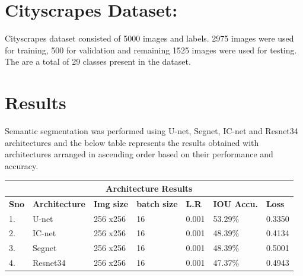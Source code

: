 \documentclass{IEEEtran}
\begin{document}
\section{\textbf{Cityscrapes Dataset:}}
Cityscrapes dataset consisted of 5000 images and labels. 2975 images were used for training, 500 for validation and remaining 1525 images were used for testing. The are a total of 29 classes present in the dataset.

\section{\textbf{Results}}
Semantic segmentation was performed using U-net, Segnet, IC-net and Resnet34 architectures and the below table represents the results obtained with architectures arranged in ascending order based on their performance and accuracy.

\begin{tabular}{ |p{0.6cm}|p{1.8cm}|p{0.6cm}|p{0.6cm}|p{0.6cm}|p{0.8cm}|p{0.8cm}|}
 \hline
 \multicolumn{7}{|c|}{\textbf{Architecture Results}} \\
 \hline
 \textbf{Sno} & \textbf{Architecture} & \textbf{Img size} & \textbf{batch size} & \textbf{L.R} & \textbf{IOU Accu.} & \textbf{Loss} \\
 \hline
 1. & U-net   & 256 x256    & 16  & 0.001 & 53.29\% & 0.3350 \\
 \hline
 2. & IC-net   & 256 x256    & 16 & 0.001 & 48.39\% & 0.4134 \\
 \hline
 3. & Segnet   & 256 x256    & 16  & 0.001 & 48.39\% & 0.5001 \\
 \hline
 4. & Resnet34   & 256 x256    & 16  & 0.001 & 47.37\% & 0.4943 \\
 \hline
\end{tabular}
\end{document}
